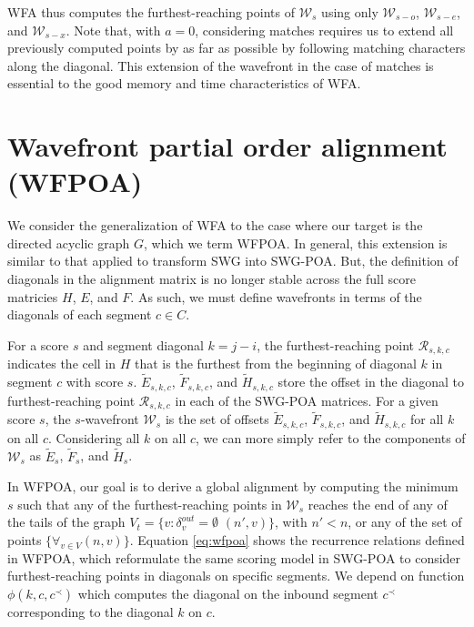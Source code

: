 \documentclass[10pt]{article}         %
\begin{document}
WFA thus computes the furthest-reaching points of $\mathcal{W}_s$ using only $\mathcal{W}_{s - o}$, $\mathcal{W}_{s - e}$, and $\mathcal{W}_{s - x}$.
Note that, with $a=0$, considering matches requires us to extend all previously computed points by as far as possible by following matching characters along the diagonal.
This extension of the wavefront in the case of matches is essential to the good memory and time characteristics of WFA\@.

\section{Wavefront partial order alignment (WFPOA)}

We consider the generalization of WFA to the case where our target is the directed acyclic graph $G$, which we term WFPOA\@.
In general, this extension is similar to that applied to transform SWG into SWG-POA\@.
But, the definition of diagonals in the alignment matrix is no longer stable across the full score matricies $H$, $E$, and $F$.
As such, we must define wavefronts in terms of the diagonals of each segment $c \in C$.

For a score $s$ and segment diagonal $k = j - i$, the furthest-reaching point $\mathcal{R}_{s,k,c}$ indicates the cell in $H$ that is the furthest from the beginning of diagonal $k$ in segment $c$ with score $s$.
$\widetilde{E}_{s, k, c}$, $\widetilde{F}_{s, k, c}$, and $\widetilde{H}_{s, k, c}$ store the offset in the diagonal to furthest-reaching point $\mathcal{R}_{s,k,c}$ in each of the SWG-POA matrices.
For a given score $s$, the $s$-wavefront $\mathcal{W}_s$ is the set of offsets $\widetilde{E}_{s, k, c}$, $\widetilde{F}_{s, k, c}$, and $\widetilde{H}_{s, k, c}$ for all $k$ on all $c$.
Considering all $k$ on all $c$, we can more simply refer to the components of $\mathcal{W}_s$ as $\widetilde{E}_s$, $\widetilde{F}_s$, and $\widetilde{H}_s$.


In WFPOA, our goal is to derive a global alignment by computing the minimum $s$ such that any of the furthest-reaching points in $\mathcal{W}_s$ reaches the end of any of the tails of the graph $V_{t} = \{ v : \delta_v^{out} = \emptyset$ $(n', v) \}$, with $n' < n$, or any of the set of points $\{ \forall_{v\in V} (n, v) \}$.
Equation \ref{eq:wfpoa} shows the recurrence relations defined in WFPOA, which reformulate the same scoring model in SWG-POA to consider furthest-reaching points in diagonals on specific segments.
We depend on function $\phi(k,c,c^\prec)$ which computes the diagonal on the inbound segment $c^\prec$ corresponding to the diagonal $k$ on $c$.
\end{document}
